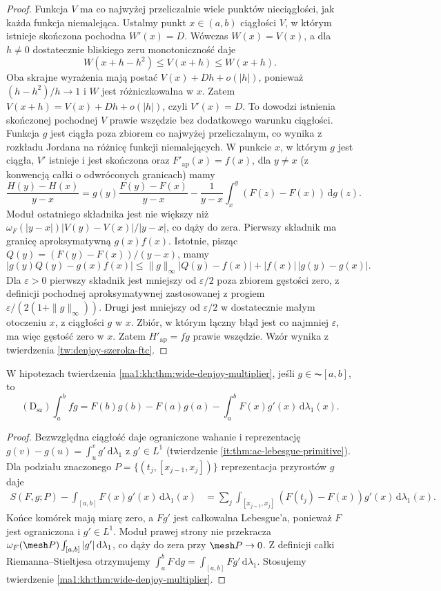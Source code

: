 \begin{proof}
Funkcja $V$ ma co najwyżej przeliczalnie wiele
punktów nieciągłości, jak każda funkcja niemalejąca.
Ustalmy punkt $x\in(a,b)$ ciągłości $V$, w którym
istnieje skończona pochodna $W'(x)=D$.
Wówczas $W(x)=V(x)$, a dla $h\ne0$ dostatecznie
bliskiego zeru monotoniczność daje
\[
 W(x+h-h^2)\le V(x+h)\le W(x+h).
\]
Oba skrajne wyrażenia mają postać $V(x)+Dh+o(|h|)$,
ponieważ $(h-h^2)/h\to1$ i $W$ jest różniczkowalna w $x$.
Zatem $V(x+h)=V(x)+Dh+o(|h|)$, czyli $V'(x)=D$.
To dowodzi istnienia skończonej pochodnej $V$
prawie wszędzie bez dodatkowego warunku ciągłości. Funkcja $g$ jest ciągła poza zbiorem co najwyżej przeliczalnym, co wynika z rozkładu Jordana na różnicę funkcji niemalejących. W punkcie $x$, w którym $g$ jest ciągła, $V'$ istnieje i jest skończona oraz $F'_{\mathrm{ap}}(x)=f(x)$, dla $y\ne x$ (z konwencją całki o odwróconych granicach) mamy
\[
 \frac{H(y)-H(x)}{y-x}
 =g(y)\frac{F(y)-F(x)}{y-x}
 -\frac{1}{y-x}\int_x^y(F(z)-F(x))\,\mathrm dg(z).
\]
Moduł ostatniego składnika jest nie większy niż $\omega_F(|y-x|)|V(y)-V(x)|/|y-x|$, co dąży do zera. Pierwszy składnik ma granicę aproksymatywną $g(x)f(x)$. Istotnie, pisząc $Q(y)=(F(y)-F(x))/(y-x)$, mamy
\[
 |g(y)Q(y)-g(x)f(x)|
 \le \|g\|_\infty|Q(y)-f(x)|+|f(x)|\,|g(y)-g(x)|.
\]
Dla $\varepsilon>0$ pierwszy składnik jest mniejszy od $\varepsilon/2$ poza zbiorem gęstości zero, z definicji pochodnej aproksymatywnej zastosowanej z progiem $\varepsilon/(2(1+\|g\|_\infty))$. Drugi jest mniejszy od $\varepsilon/2$ w dostatecznie małym otoczeniu $x$, z ciągłości $g$ w $x$. Zbiór, w którym łączny błąd jest co najmniej $\varepsilon$, ma więc gęstość zero w $x$. Zatem $H'_{\mathrm{ap}}=fg$ prawie wszędzie. Wzór wynika z twierdzenia \ref{tw:denjoy-szeroka-ftc}.
\end{proof}

\begin{wniosek}\label{ma1:kh:cor:wide-denjoy-ibp-ac}
W hipotezach twierdzenia \ref{ma1:kh:thm:wide-denjoy-multiplier}, jeśli $g\in\AC[a,b]$, to
\[
 (\mathrm D_{\mathrm{sz}})\int_a^b fg
 =F(b)g(b)-F(a)g(a)-\int_a^b F(x)g'(x)\,\mathrm d\lambda_1(x).
\]
\end{wniosek}
\begin{proof}
Bezwzględna ciągłość daje ograniczone wahanie i reprezentację $g(v)-g(u)=\int_u^v g'\,\mathrm d\lambda_1$ z $g'\in L^1$ (twierdzenie \ref{it:thm:ac-lebesgue-primitive}). Dla podziału znaczonego $P=\{(t_j,[x_{j-1},x_j])\}$
reprezentacja przyrostów $g$ daje
\[
\begin{aligned}
 S(F,g;P)-\int_{[a,b]}F(x)g'(x)\,\mathrm d\lambda_1(x)
 &=\sum_j\int_{[x_{j-1},x_j]}
 (F(t_j)-F(x))g'(x)\,\mathrm d\lambda_1(x).
\end{aligned}
\]
Końce komórek mają miarę zero, a $Fg'$ jest całkowalna
Lebesgue'a, ponieważ $F$ jest ograniczona i $g'\in L^1$.
Moduł prawej strony nie przekracza
$\omega_F(\mesh P)\int_{[a,b]}|g'|\,\mathrm d\lambda_1$,
co dąży do zera przy $\mesh P\to0$.
Z definicji całki Riemanna--Stieltjesa otrzymujemy
$\int_a^b F\,\mathrm dg=\int_{[a,b]}Fg'\,\mathrm d\lambda_1$. Stosujemy twierdzenie \ref{ma1:kh:thm:wide-denjoy-multiplier}.
\end{proof}

